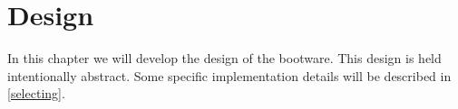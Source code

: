 \chapter{Design}
\label{design}

In this chapter we will develop the design of the bootware.
This design is held intentionally abstract.
Some specific implementation details will be described in \autoref{selecting}.












